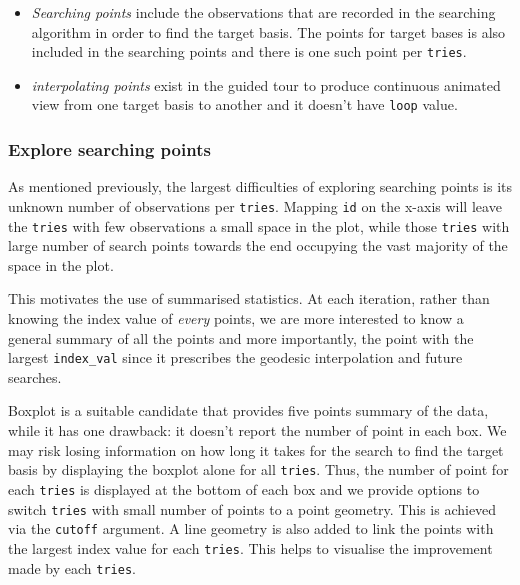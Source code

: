 \documentclass[12pt]{article}
\begin{document}
\begin{itemize}
\item
  \emph{Searching points} include the observations that are recorded in
  the searching algorithm in order to find the target basis. The points
  for target bases is also included in the searching points and there is
  one such point per \texttt{tries}.
\item
  \emph{interpolating points} exist in the guided tour to produce
  continuous animated view from one target basis to another and it
  doesn't have \texttt{loop} value.
\end{itemize}

\hypertarget{explore-searching-points}{%
\subsubsection{Explore searching
points}\label{explore-searching-points}}

As mentioned previously, the largest difficulties of exploring searching
points is its unknown number of observations per \texttt{tries}. Mapping
\texttt{id} on the x-axis will leave the \texttt{tries} with few
observations a small space in the plot, while those \texttt{tries} with
large number of search points towards the end occupying the vast
majority of the space in the plot.

This motivates the use of summarised statistics. At each iteration,
rather than knowing the index value of \emph{every} points, we are more
interested to know a general summary of all the points and more
importantly, the point with the largest \texttt{index\_val} since it
prescribes the geodesic interpolation and future searches.

Boxplot is a suitable candidate that provides five points summary of the
data, while it has one drawback: it doesn't report the number of point
in each box. We may risk losing information on how long it takes for the
search to find the target basis by displaying the boxplot alone for all
\texttt{tries}. Thus, the number of point for each \texttt{tries} is
displayed at the bottom of each box and we provide options to switch
\texttt{tries} with small number of points to a point geometry. This is
achieved via the \texttt{cutoff} argument. A line geometry is also added
to link the points with the largest index value for each \texttt{tries}.
This helps to visualise the improvement made by each \texttt{tries}.
\end{document}
